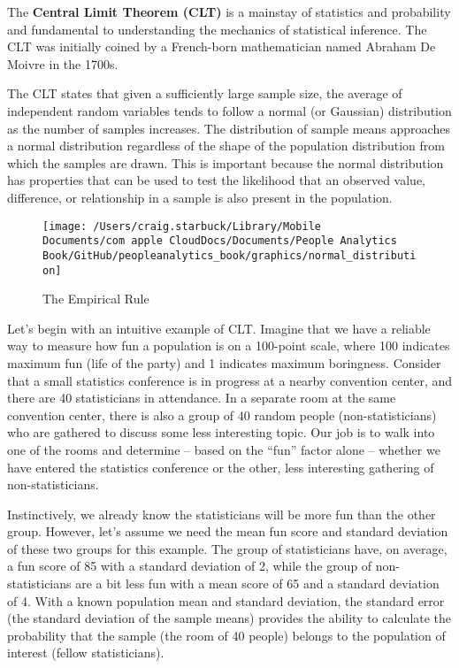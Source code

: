 \documentclass[
]{book}
\begin{document}
The \textbf{Central Limit Theorem (CLT)} is a mainstay of statistics and probability and fundamental to understanding the mechanics of statistical inference. The CLT was initially coined by a French-born mathematician named Abraham De Moivre in the 1700s.

The CLT states that given a sufficiently large sample size, the average of independent random variables tends to follow a normal (or Gaussian) distribution as the number of samples increases. The distribution of sample means approaches a normal distribution regardless of the shape of the population distribution from which the samples are drawn. This is important because the normal distribution has properties that can be used to test the likelihood that an observed value, difference, or relationship in a sample is also present in the population.

\begin{figure}

{\centering \texttt{[image: /Users/craig.starbuck/Library/Mobile Documents/com~apple~CloudDocs/Documents/People Analytics Book/GitHub/peopleanalytics\_book/graphics/normal\_distribution]} 

}

\caption{The Empirical Rule}\label{fig:emp-rule}
\end{figure}

Let's begin with an intuitive example of CLT. Imagine that we have a reliable way to measure how fun a population is on a 100-point scale, where 100 indicates maximum fun (life of the party) and 1 indicates maximum boringness. Consider that a small statistics conference is in progress at a nearby convention center, and there are 40 statisticians in attendance. In a separate room at the same convention center, there is also a group of 40 random people (non-statisticians) who are gathered to discuss some less interesting topic. Our job is to walk into one of the rooms and determine -- based on the ``fun'' factor alone -- whether we have entered the statistics conference or the other, less interesting gathering of non-statisticians.

Instinctively, we already know the statisticians will be more fun than the other group. However, let's assume we need the mean fun score and standard deviation of these two groups for this example. The group of statisticians have, on average, a fun score of 85 with a standard deviation of 2, while the group of non-statisticians are a bit less fun with a mean score of 65 and a standard deviation of 4. With a known population mean and standard deviation, the standard error (the standard deviation of the sample means) provides the ability to calculate the probability that the sample (the room of 40 people) belongs to the population of interest (fellow statisticians).
\end{document}
